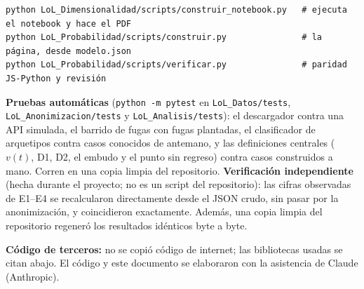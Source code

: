 \documentclass[11pt,letterpaper]{article}
\begin{document}
\begin{Verbatim}[fontsize=\small, formatcom=\codigo, frame=lines]
python LoL_Dimensionalidad/scripts/construir_notebook.py   # ejecuta el notebook y hace el PDF
python LoL_Probabilidad/scripts/construir.py               # la página, desde modelo.json
python LoL_Probabilidad/scripts/verificar.py               # paridad JS-Python y revisión
\end{Verbatim}

\noindent \textbf{Pruebas automáticas} (\texttt{python -m pytest} en
\texttt{LoL\_Datos/tests}, \texttt{LoL\_Anonimizacion/tests} y
\texttt{LoL\_Analisis/tests}): el descargador contra una API simulada, el barrido de
fugas con fugas plantadas, el clasificador de arquetipos contra casos conocidos de
antemano, y las definiciones centrales (\(v(t)\), D1, D2, el embudo y el punto sin
regreso) contra casos construidos a mano. Corren en una copia limpia del repositorio.
\textbf{Verificación independiente} (hecha durante el proyecto; no es un script del
repositorio): las cifras observadas de E1--E4 se recalcularon directamente desde el
JSON crudo, sin pasar por la anonimización, y coincidieron exactamente. Además, una
copia limpia del repositorio regeneró los resultados idénticos byte a byte.

\noindent \textbf{Código de terceros:} no se copió código de internet; las bibliotecas
usadas se citan abajo. El código y este documento se elaboraron con la asistencia de
Claude (Anthropic).

\end{document}
